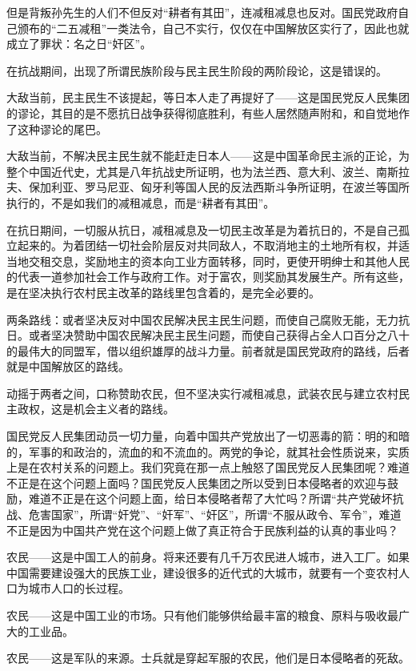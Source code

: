 但是背叛孙先生的人们不但反对“耕者有其田”，连减租减息也反对。国民党政府自己颁布的“二五减租”一类法令，自己不实行，仅仅在中国解放区实行了，因此也就成立了罪状：名之日“奸区”。

在抗战期间，出现了所谓民族阶段与民主民生阶段的两阶段论，这是错误的。

大敌当前，民主民生不该提起，等日本人走了再提好了——这是国民党反人民集团的谬论，其目的是不愿抗日战争获得彻底胜利，有些人居然随声附和，和自觉地作了这种谬论的尾巴。

大敌当前，不解决民主民生就不能赶走日本人——这是中国革命民主派的正论，为整个中国近代史，尤其是八年抗战史所证明，也为法兰西、意大利、波兰、南斯拉夫、保加利亚、罗马尼亚、匈牙利等国人民的反法西斯斗争所证明，在波兰等国所执行的，不是如我们的减租减息，而是“耕者有其田”。

在抗日期间，一切服从抗日，减租减息及一切民主改革是为着抗日的，不是自己孤立起来的。为着团结一切社会阶层反对共同敌人，不取消地主的土地所有权，并适当地交租交息，奖励地主的资本向工业方面转移，同时，更使开明绅士和其他人民的代表一道参加社会工作与政府工作。对于富农，则奖励其发展生产。所有这些，是在坚决执行农村民主改革的路线里包含着的，是完全必要的。

两条路线：或者坚决反对中国农民解决民主民生问题，而使自己腐败无能，无力抗日。或者坚决赞助中国农民解决民主民生问题，而使自己获得占全人口百分之八十的最伟大的同盟军，借以组织雄厚的战斗力量。前者就是国民党政府的路线，后者就是中国解放区的路线。

动摇于两者之间，口称赞助农民，但不坚决实行减租减息，武装农民与建立农村民主政权，这是机会主义者的路线。

国民党反人民集团动员一切力量，向着中国共产党放出了一切恶毒的箭：明的和暗的，军事的和政治的，流血的和不流血的。两党的争论，就其社会性质说来，实质上是在农村关系的问题上。我们究竟在那一点上触怒了国民党反人民集团呢？难道不正是在这个问题上面吗？国民党反人民集团之所以受到日本侵略者的欢迎与鼓励，难道不正是在这个问题上面，给日本侵略者帮了大忙吗？所谓“共产党破坏抗战、危害国家”，所谓“奸党”、“奸军”、“奸区”，所谓“不服从政令、军令”，难道不正是因为中国共产党在这个问题上做了真正符合于民族利益的认真的事业吗？

农民——这是中国工人的前身。将来还要有几千万农民进人城市，进入工厂。如果中国需要建设强大的民族工业，建设很多的近代式的大城市，就要有一个变农村人口为城市人口的长过程。

农民——这是中国工业的市场。只有他们能够供给最丰富的粮食、原料与吸收最广大的工业品。

农民——这是军队的来源。士兵就是穿起军服的农民，他们是日本侵略者的死敌。

